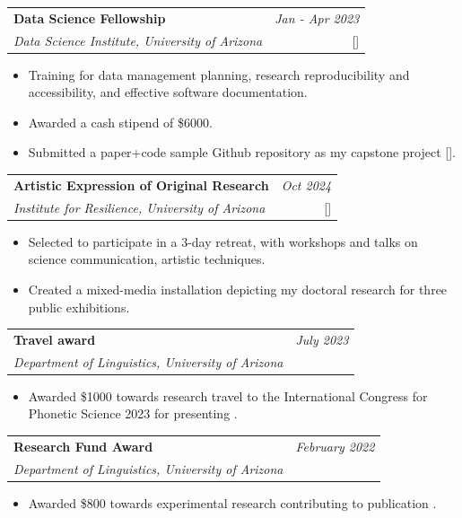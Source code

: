 \documentclass[a4paper,12pt]{article}
\makeatletter
\newcommand{\resumeProject}[4]{
\vspace{0.5mm}\item
    \begin{tabular*}{0.98\textwidth}[t]{l@{\extracolsep{\fill}}r}
        \textbf{#1} & \textit{\footnotesize{#3}} \\
        \footnotesize{\textit{#2}} & \footnotesize{#4}
    \end{tabular*}
    \vspace{-2.4mm}
}
\newcommand{\resumeItemListStart}{\begin{itemize}[leftmargin=*,labelsep=1mm,itemsep=0.5mm]}
\newcommand{\resumeItemListEnd}{\end{itemize}\vspace{-2mm}}
\makeatother
\begin{document}
    \resumeProject
      {Data Science Fellowship}
      {Data Science Institute, University of Arizona}
      {Jan - Apr 2023}      {[\href{https://datascience.arizona.edu/education/data-science-fellows}{\textcolor{darkblue}{\faIcon{globe}}}]}
        \resumeItemListStart
          \item Training for data management planning, research reproducibility and accessibility, and effective
software documentation.
          \item Awarded a cash stipend of \$6000.
          \item Submitted a paper+code sample Github repository as my capstone project [\href{https://github.com/meghavarshini/foss_capstone_entrainment_detector}{\faGithub}].
        \resumeItemListEnd
    
    \resumeProject
      {Artistic Expression of Original Research}
      {Institute for Resilience, University of Arizona}
      {Oct 2024}
      {{}[\href{https://arts.arizona.edu/exhibition-brings-together-science-art-and-community-building/}{\textcolor{darkblue}{\faIcon{globe}}}]}
        \resumeItemListStart
          \item Selected to participate in a 3-day retreat, with workshops and talks on science communication, artistic techniques.
          \item Created a mixed-media installation depicting my doctoral research for three public exhibitions.
        \resumeItemListEnd
    
    \resumeProject
      {Travel award}
      {Department of Linguistics, University of Arizona}
      {July 2023}
      {}%
        \resumeItemListStart
          \item Awarded \$1000 towards research travel to the International Congress for Phonetic Science 2023 for presenting \cite{krishnaswamy2023perception, mitracoarticulation,gp2023mismatch}.
        \resumeItemListEnd
 
    \resumeProject
      {Research Fund Award}
      {Department of Linguistics, University of Arizona}
      {February 2022}
      {}%
        \resumeItemListStart
          \item Awarded \$800 towards experimental research contributing to publication \cite{krishnaswamy2023perception}.
        \resumeItemListEnd
    
\end{document}
